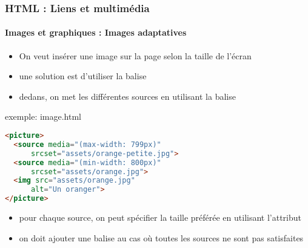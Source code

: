 \documentclass[xcolor=table]{beamer}
\begin{document}
\begin{frame}[fragile]
\frametitle{HTML : Liens et multimédia}
\framesubtitle{Images et graphiques : Images adaptatives}

\begin{minipage}{0.50\textwidth} 
	\begin{itemize}
		\item On veut insérer une image sur la page selon la taille de l'écran
		\item une solution est d'utiliser la balise 
		\item dedans, on met les différentes sources en utilisant la balise 
	\end{itemize}
\end{minipage}
%
\begin{minipage}{0.49\textwidth}
\begin{exampleblock}{exemple: image.html}
\lstset{escapeinside=**}
\scriptsize\bfseries\vspace{-6pt}
\begin{lstlisting}[language={html}]
<picture>
  <source media="(max-width: 799px)" 
      srcset="assets/orange-petite.jpg">
  <source media="(min-width: 800px)" 
      srcset="assets/orange.jpg">
  <img src="assets/orange.jpg" 
      alt="Un oranger">
</picture>
\end{lstlisting}\vspace{-6pt}
\end{exampleblock}
\end{minipage}

\begin{itemize}
	\item pour chaque source, on peut spécifier la taille préférée en utilisant l'attribut 
	\item on doit ajouter une balise  au cas où toutes les sources ne sont pas satisfaites
\end{itemize}

\end{frame}
\end{document}
